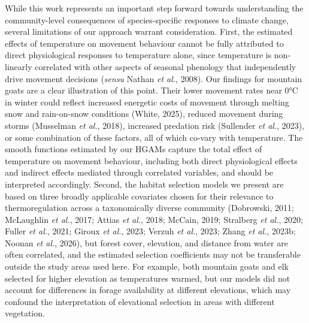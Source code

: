 \documentclass[
  12pt,
]{article}
\begin{document}
While this work represents an important step forward towards understanding the community-level consequences of species-specific responses to climate change, several limitations of our approach warrant consideration. First, the estimated effects of temperature on movement behaviour cannot be fully attributed to direct physiological responses to temperature alone, since temperature is non-linearly correlated with other aspects of seasonal phenology that independently drive movement decisions (\emph{sensu} Nathan \emph{et al.}, 2008). Our findings for mountain goats are a clear illustration of this point. Their lower movement rates near 0°C in winter could reflect increased energetic costs of movement through melting snow and rain-on-snow conditions (White, 2025), reduced movement during storms (Musselman \emph{et al.}, 2018), increased predation risk (Sullender \emph{et al.}, 2023), or some combination of these factors, all of which co-vary with temperature. The smooth functions estimated by our HGAMs capture the total effect of temperature on movement behaviour, including both direct physiological effects and indirect effects mediated through correlated variables, and should be interpreted accordingly. Second, the habitat selection models we present are based on three broadly applicable covariates chosen for their relevance to thermoregulation across a taxonomically diverse community (Dobrowski, 2011; McLaughlin \emph{et al.}, 2017; Attias \emph{et al.}, 2018; McCain, 2019; Stralberg \emph{et al.}, 2020; Fuller \emph{et al.}, 2021; Giroux \emph{et al.}, 2023; Verzuh \emph{et al.}, 2023; Zhang \emph{et al.}, 2023b; Noonan \emph{et al.}, 2026), but forest cover, elevation, and distance from water are often correlated, and the estimated selection coefficients may not be transferable outside the study areas used here. For example, both mountain goats and elk selected for higher elevation as temperatures warmed, but our models did not account for differences in forage availability at different elevations, which may confound the interpretation of elevational selection in areas with different vegetation.
\end{document}
